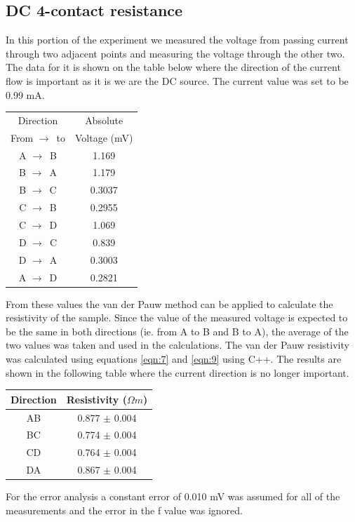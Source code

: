 \documentclass[twocolumn]{article}
\begin{document}
\subsection{DC 4-contact resistance}
In this portion of the experiment we measured the voltage from passing current 
through two adjacent points and measuring the voltage through the other two. 
The data for it is shown on the table below where the direction of the current 
flow is important as it is we are the DC source. The current value was set to 
be 0.99 mA.
\begin{minipage}{\linewidth}
\Centering
\begin{tabular}{|c|c|}
\hline
Direction & Absolute \\ From $\to\,$ to & Voltage (mV) \\ \hline
A $\to\,$ B & 1.169 \\ \hline
B $\to\,$ A & 1.179 \\ \hline
B $\to\,$ C & 0.3037 \\ \hline
C $\to\,$ B & 0.2955 \\ \hline
C $\to\,$ D & 1.069 \\ \hline
D $\to\,$ C & 0.839 \\ \hline
D $\to\,$ A & 0.3003 \\ \hline
A $\to\,$ D & 0.2821 \\ \hline
\end{tabular}
\label{tbl:4}
\end{minipage}
From these values the van der Pauw method can be applied to calculate the 
resistivity of the sample. Since the value of the measured voltage is expected 
to be the same in both directions (ie. from A to B and B to A), the average of 
the two values was taken and used in the calculations. The van der Pauw 
resistivity was calculated using equations \ref{eqn:7} and \ref{eqn:9} using 
C++. The results are shown in the following table where the current direction 
is no longer important.
\begin{minipage}{\linewidth}
\Centering
\begin{tabular}{|c|c|}
\hline
Direction & Resistivity ($\Omega m$) \\ \hline
AB & 0.877 $\pm$ 0.004 \\ \hline
BC & 0.774 $\pm$ 0.004 \\ \hline
CD & 0.764 $\pm$ 0.004 \\ \hline
DA & 0.867 $\pm$ 0.004 \\ \hline
\end{tabular}
\label{tbl:5}
\end{minipage}
For the error analysis a constant error of 0.010 mV was assumed for all of the 
measurements and the error in the f value was ignored.
\end{document}
